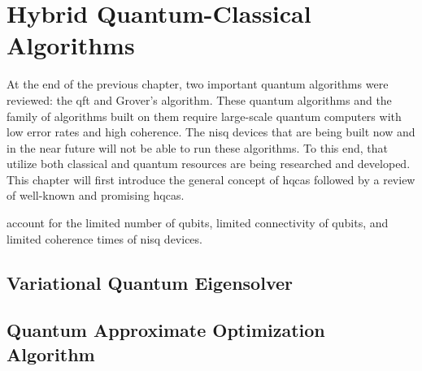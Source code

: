 \chapter[Hybrid Quantum-Classical Algorithms]{Hybrid Quantum-Classical\\Algorithms} \label{chap:hybrid-quantum-classical-algorithms}
At the end of the previous chapter, two important quantum algorithms were reviewed: the \gls{qft} and Grover's algorithm.
These quantum algorithms and the family of algorithms built on them require large-scale quantum computers with low error rates and high coherence.
The \gls{nisq} devices that are being built now and in the near future will not be able to run these algorithms.
To this end,  that utilize both classical and quantum resources are being researched and developed.
This chapter will first introduce the general concept of \glspl{hqca} followed by a review of well-known and promising \glspl{hqca}.

 account for the limited number of qubits, limited connectivity of qubits, and limited coherence times of \gls{nisq} devices.

\section{Variational Quantum Eigensolver}

\section{Quantum Approximate Optimization Algorithm}